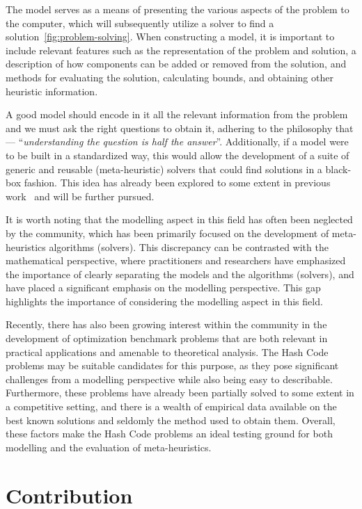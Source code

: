 The model serves as a means of presenting the various aspects of the problem to
the computer, which will subsequently utilize a solver to find a
solution~\ref{fig:problem-solving}. When constructing a model, it is important
to include relevant features such as the representation of the problem and
solution, a description of how components can be added or removed from the
solution, and methods for evaluating the solution, calculating bounds, and
obtaining other heuristic information.

A good model should encode in it all the relevant information from the problem
and we must ask the right questions to obtain it, adhering to the philosophy that ---
``\textit{understanding the question is half the answer}''. Additionally, if a
model were to be built in a standardized way, this would allow the development of
a suite of generic and reusable (meta-heuristic) solvers that could find
solutions in a black-box fashion. This idea has already been explored to some
extent in previous work~\cite{outeiro2021application,vieira2009uma} and will be
further pursued.

It is worth noting that the modelling aspect in this field has often been
neglected by the community, which has been primarily focused on the development
of meta-heuristics algorithms (solvers). This discrepancy can be contrasted with
the mathematical perspective, where practitioners and researchers have
emphasized the importance of clearly separating the models and the algorithms
(solvers), and have placed a significant emphasis on the modelling perspective.
This gap highlights the importance of considering the modelling aspect in this
field.

Recently, there has also been growing interest within the community in the
development of optimization benchmark problems that are both relevant in
practical applications and amenable to theoretical analysis. The Hash Code
problems may be suitable candidates for this purpose, as they pose significant
challenges from a modelling perspective while also being easy to describable.
Furthermore, these problems have already been partially solved to some extent
in a competitive setting, and there is a wealth of empirical data available on
the best known solutions and seldomly the method used to obtain them. Overall,
these factors make the Hash Code problems an ideal testing ground for both
modelling and the evaluation of meta-heuristics.

\section{Contribution}
\label{section:contribution}


